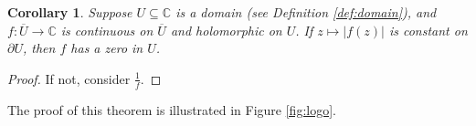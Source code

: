 \documentclass{article}
\newtheorem{corollary}{Corollary}[theorem]
\theoremstyle{definition}
\theoremstyle{remark}
\begin{document}
\begin{corollary}
Suppose $U \subseteq \mathbb{C}$ is a domain (see Definition \ref{def:domain}), and $f: \overline{U} \rightarrow \mathbb{C}$ is continuous on $\overline{U}$ and holomorphic on $U$. If $z \mapsto |f(z)|$ is constant on $\partial U$, then $f$ has a zero in $U$.
\end{corollary}
\begin{proof}
If not, consider $\frac{1}{f}$.
\end{proof}
The proof of this theorem is illustrated in Figure \ref{fig:logo}.



\newpage




\end{document}
